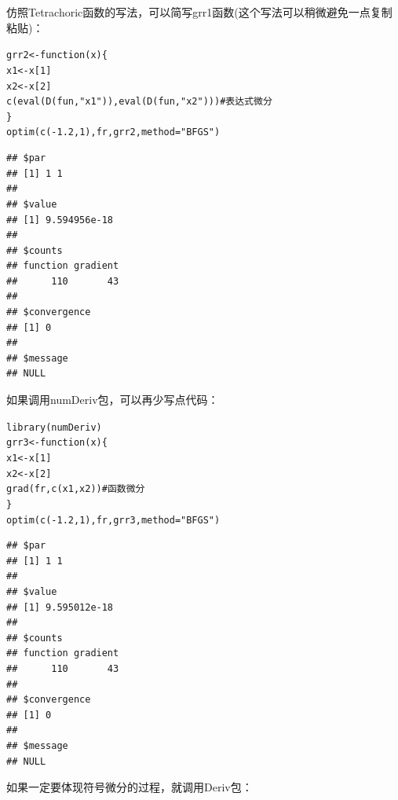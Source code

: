 \documentclass[a4paper]{ctexart}\usepackage[]{graphicx}\usepackage[]{color}
\makeatletter
\newcommand{\hlnum}[1]{\textcolor[rgb]{0.502,0.086,1}{#1}}%
\newcommand{\hlstr}[1]{\textcolor[rgb]{1,0.4,0.2}{#1}}%
\newcommand{\hlcom}[1]{\textcolor[rgb]{1,0.251,0.502}{#1}}%
\newcommand{\hlopt}[1]{\textcolor[rgb]{0.251,0.251,0.251}{#1}}%
\newcommand{\hlstd}[1]{\textcolor[rgb]{0.251,0.251,0.251}{#1}}%
\newcommand{\hlkwa}[1]{\textcolor[rgb]{0.941,0.188,0.816}{#1}}%
\newcommand{\hlkwb}[1]{\textcolor[rgb]{0,0.439,0.902}{#1}}%
\newcommand{\hlkwc}[1]{\textcolor[rgb]{0.188,0.941,0.314}{#1}}%
\newcommand{\hlkwd}[1]{\textcolor[rgb]{0.69,0.188,0.941}{#1}}%
\newenvironment{kframe}{%
 \def\at@end@of@kframe{}%
 \ifinner\ifhmode%
  \def\at@end@of@kframe{\end{minipage}}%
  \begin{minipage}{\columnwidth}%
 \fi\fi%
 \def\FrameCommand##1{\hskip\@totalleftmargin \hskip-\fboxsep
 \colorbox{shadecolor}{##1}\hskip-\fboxsep
     \hskip-\linewidth \hskip-\@totalleftmargin \hskip\columnwidth}%
 \MakeFramed {\advance\hsize-\width
   \@totalleftmargin\z@ \linewidth\hsize
   \@setminipage}}%
 {\par\unskip\endMakeFramed%
 \at@end@of@kframe}
\newenvironment{knitrout}{}{} %
\makeatother
\begin{document}
仿照Tetrachoric函数的写法，可以简写grr1函数(这个写法可以稍微避免一点复制粘贴)：
\begin{knitrout}
\color{fgcolor}\begin{kframe}
\begin{alltt}
\hlstd{grr2} \hlkwb{<-} \hlkwa{function}\hlstd{(}\hlkwc{x}\hlstd{) \{}
    \hlstd{x1} \hlkwb{<-} \hlstd{x[}\hlnum{1}\hlstd{]}
    \hlstd{x2} \hlkwb{<-} \hlstd{x[}\hlnum{2}\hlstd{]}
    \hlkwd{c}\hlstd{(}\hlkwd{eval}\hlstd{(}\hlkwd{D}\hlstd{(fun,} \hlstr{"x1"}\hlstd{)),} \hlkwd{eval}\hlstd{(}\hlkwd{D}\hlstd{(fun,} \hlstr{"x2"}\hlstd{)))}  \hlcom{# 表达式微分}
\hlstd{\}}
\hlkwd{optim}\hlstd{(}\hlkwd{c}\hlstd{(}\hlopt{-}\hlnum{1.2}\hlstd{,} \hlnum{1}\hlstd{), fr, grr2,} \hlkwc{method} \hlstd{=} \hlstr{"BFGS"}\hlstd{)}
\end{alltt}
\begin{verbatim}
## $par
## [1] 1 1
## 
## $value
## [1] 9.594956e-18
## 
## $counts
## function gradient 
##      110       43 
## 
## $convergence
## [1] 0
## 
## $message
## NULL
\end{verbatim}
\end{kframe}
\end{knitrout}
如果调用numDeriv包\cite{numDeriv}，可以再少写点代码：
\begin{knitrout}
\color{fgcolor}\begin{kframe}
\begin{alltt}
\hlkwd{library}\hlstd{(numDeriv)}
\hlstd{grr3} \hlkwb{<-} \hlkwa{function}\hlstd{(}\hlkwc{x}\hlstd{) \{}
    \hlstd{x1} \hlkwb{<-} \hlstd{x[}\hlnum{1}\hlstd{]}
    \hlstd{x2} \hlkwb{<-} \hlstd{x[}\hlnum{2}\hlstd{]}
    \hlkwd{grad}\hlstd{(fr,} \hlkwd{c}\hlstd{(x1, x2))}  \hlcom{# 函数微分}
\hlstd{\}}
\hlkwd{optim}\hlstd{(}\hlkwd{c}\hlstd{(}\hlopt{-}\hlnum{1.2}\hlstd{,} \hlnum{1}\hlstd{), fr, grr3,} \hlkwc{method} \hlstd{=} \hlstr{"BFGS"}\hlstd{)}
\end{alltt}
\begin{verbatim}
## $par
## [1] 1 1
## 
## $value
## [1] 9.595012e-18
## 
## $counts
## function gradient 
##      110       43 
## 
## $convergence
## [1] 0
## 
## $message
## NULL
\end{verbatim}
\end{kframe}
\end{knitrout}
如果一定要体现符号微分的过程，就调用Deriv包：
\end{document}
